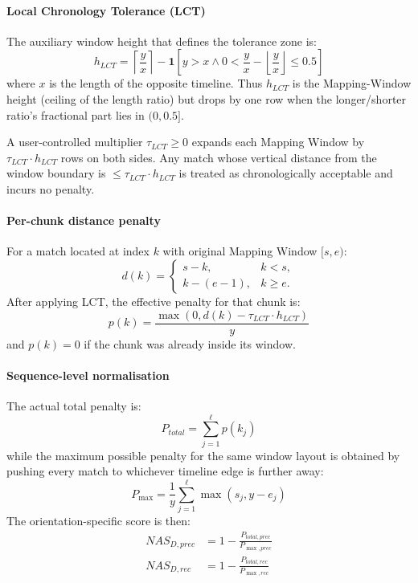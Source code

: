 \documentclass[main.tex]{subfiles}
\begin{document}
\paragraph{Local Chronology Tolerance (LCT)}
The auxiliary window height that defines the tolerance zone is:
\begin{equation}
h_{LCT} = \left\lceil \frac{y}{x} \right\rceil - \mathbf{1}[y > x \land 0 < \frac{y}{x} - \left\lfloor \frac{y}{x} \right\rfloor \leq 0.5]
\end{equation}
where $x$ is the length of the opposite timeline. Thus $h_{LCT}$ is the Mapping-Window height (ceiling of the length ratio) but drops by one row when the longer/shorter ratio's fractional part lies in $(0, 0.5]$.

A user-controlled multiplier $\tau_{LCT} \geq 0$ expands each Mapping Window by $\tau_{LCT} \cdot h_{LCT}$ rows on both sides. Any match whose vertical distance from the window boundary is $\leq \tau_{LCT} \cdot h_{LCT}$ is treated as chronologically acceptable and incurs no penalty.

\paragraph{Per-chunk distance penalty}
For a match located at index $k$ with original Mapping Window $[s, e)$:
\begin{equation}
d(k) = \begin{cases}
s - k, & k < s, \\
k - (e - 1), & k \geq e.
\end{cases}
\end{equation}
After applying LCT, the effective penalty for that chunk is:
\begin{equation}
p(k) = \frac{\max(0, d(k) - \tau_{LCT} \cdot h_{LCT})}{y}
\end{equation}
and $p(k) = 0$ if the chunk was already inside its window.

\paragraph{Sequence-level normalisation}
The actual total penalty is:
\begin{equation}
P_{total} = \sum_{j=1}^{\ell} p(k_j)
\end{equation}
while the maximum possible penalty for the same window layout is obtained by pushing every match to whichever timeline edge is further away:
\begin{equation}
P_{\max} = \frac{1}{y} \sum_{j=1}^{\ell} \max(s_j, y - e_j)
\end{equation}
The orientation-specific score is then:
\begin{align}
NAS_{D,prec} &= 1 - \frac{P_{total,prec}}{P_{\max,prec}} \\
NAS_{D,rec} &= 1 - \frac{P_{total,rec}}{P_{\max,rec}}
\end{align}
\end{document}
